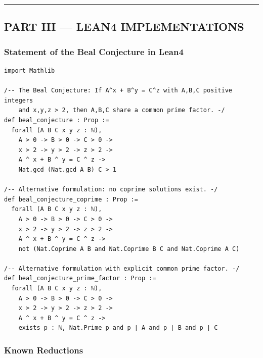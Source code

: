 \documentclass[12pt,a4paper]{article}
\begin{document}
\begin{center}
\rule{0.5\textwidth}{0.4pt}
\end{center}

\subsection{PART III --- LEAN4 IMPLEMENTATIONS}

\subsubsection{Statement of the Beal Conjecture in Lean4}

\begin{lstlisting}[language=lean4]
import Mathlib

/-- The Beal Conjecture: If A^x + B^y = C^z with A,B,C positive integers
    and x,y,z > 2, then A,B,C share a common prime factor. -/
def beal_conjecture : Prop :=
  forall (A B C x y z : ℕ),
    A > 0 -> B > 0 -> C > 0 ->
    x > 2 -> y > 2 -> z > 2 ->
    A ^ x + B ^ y = C ^ z ->
    Nat.gcd (Nat.gcd A B) C > 1

/-- Alternative formulation: no coprime solutions exist. -/
def beal_conjecture_coprime : Prop :=
  forall (A B C x y z : ℕ),
    A > 0 -> B > 0 -> C > 0 ->
    x > 2 -> y > 2 -> z > 2 ->
    A ^ x + B ^ y = C ^ z ->
    not (Nat.Coprime A B and Nat.Coprime B C and Nat.Coprime A C)

/-- Alternative formulation with explicit common prime factor. -/
def beal_conjecture_prime_factor : Prop :=
  forall (A B C x y z : ℕ),
    A > 0 -> B > 0 -> C > 0 ->
    x > 2 -> y > 2 -> z > 2 ->
    A ^ x + B ^ y = C ^ z ->
    exists p : ℕ, Nat.Prime p and p ∣ A and p ∣ B and p ∣ C
\end{lstlisting}

\subsubsection{Known Reductions}
\end{document}
